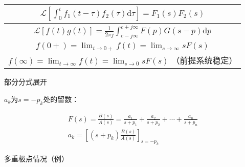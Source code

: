 \begin{centering}
\begin{longtable}{|c|}
        $\mathscr{L}\left[\int_{0}^{t} f_{1}(t-\tau) f_{2}(\tau) \mathrm{d} \tau\right]=F_{1}(s) F_{2}(s)$\\  \hline
        $\mathscr{L}[f(t) g(t)]=\frac{1}{2 \pi j} \int_{c-j \infty}^{c+j \infty} F(p) G(s-p) \mathrm{d} p$\\  \hline
        $f(0+)=\lim _{t \rightarrow 0+} f(t)=\lim _{s \rightarrow \infty} s F(s)$\\  \hline
        $f(\infty)=\lim _{t \rightarrow \infty} f(t)=\lim _{s \rightarrow 0} s F(s)$ （前提系统稳定）\\
        \hline
    \end{longtable}
\end{centering}

\newpage

部分分式展开

$a_k$为$s=-p_k$处的留数：

\begin{gather*}
    F(s)=\frac{B(s)}{A(s)}=\frac{a_{1}}{s+p_{1}}+\frac{a_{2}}{s+p_{2}}+\cdots+\frac{a_{n}}{s+p_{n}}\\
    a_{k}=\left[\left(s+p_{k}\right) \frac{B(s)}{A(s)}\right]_{s=-p_{k}}
\end{gather*}

多重极点情况（例）

